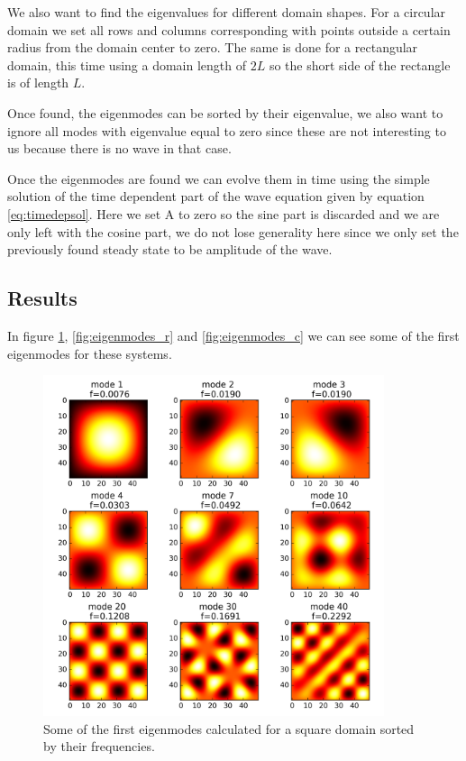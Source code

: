\documentclass[a4paper]{article}
\begin{document}
We also want to find the eigenvalues for different domain shapes. For a circular domain we set all rows and columns corresponding with points outside a certain radius from the domain center to zero. The same is done for a rectangular domain, this time using a domain length of $2L$ so the short side of the rectangle is of length $L$. 

Once found, the eigenmodes can be sorted by their eigenvalue, we also want to ignore all modes with eigenvalue equal to zero since these are not interesting to us because there is no wave in that case.

Once the eigenmodes are found we can evolve them in time using the simple solution of the time dependent part of the wave equation given by equation \ref{eq:timedepsol}. Here we set A to zero so the sine part is discarded and we are only left with the cosine part, we do not lose generality here since we only set the previously found steady state to be amplitude of the wave. 


\subsection{Results}
In figure \ref{fig:eigenmodes_s}, \ref{fig:eigenmodes_r} and \ref{fig:eigenmodes_c} we can see some of the first eigenmodes for these systems. 

\begin{figure}
\centering
\includegraphics[width=10cm]{Pictures/eigenmodes_s.png}
\caption{Some of the first eigenmodes calculated for a square domain sorted by their frequencies.}
\label{fig:eigenmodes_s}
\end{figure}
\end{document}
